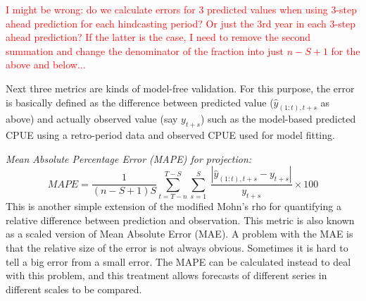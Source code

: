 \documentclass[a4paper]{article}
\newcommand{\disp}{\displaystyle}
\newcommand{\red}{\textcolor{red}}
\begin{document}
\red{I might be wrong: do we calculate errors for 3 predicted values when using 3-step ahead prediction for each hindcasting period? Or just the 3rd year in each 3-step ahead prediction? If the latter is the case, I need to remove the second summation and change the denominator of the fraction into just $n-S+1$ for the above and below... }

\vspace{0.2cm} 
Next three metrics are kinds of model-free validation. For this purpose, the error is basically defined as the difference between predicted value ($\hat{y}_{(1:t),t+s}$ as above) and actually observed value (say $y_{t+s}$) such as the model-based predicted CPUE using a retro-period data and observed CPUE used for model fitting. 

\vspace{0.2cm} \noindent
{\it Mean Absolute Percentage Error (MAPE) for projection:}
\begin{equation}
MAPE = \disp \frac{1}{(n-S+1)S} \sum_{t=T-n}^{T-S} \sum_{s=1}^S \
\frac{\left| \hat{y}_{(1:t),t+s}-y_{t+s} \right|}{y_{t+s}} \times 100 
\end{equation} 
This is another simple extension of the modified Mohn's rho for quantifying a relative difference between prediction and observation. This metric is also known as a scaled version of Mean Absolute Error (MAE). A problem with the MAE is that the relative size of the error is not always obvious. Sometimes it is hard to tell a big error from a small error. The MAPE can be calculated instead to deal with this problem, and this treatment allows forecasts of different series in different scales to be compared.
\end{document}
